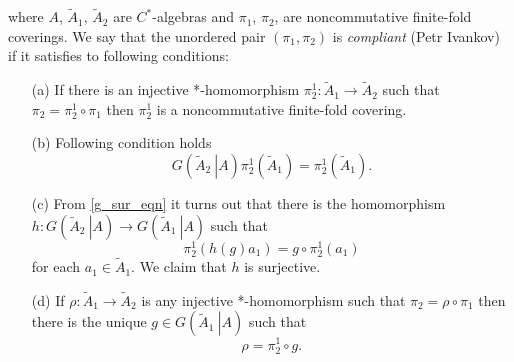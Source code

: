 \documentclass{beamer}
\theoremstyle{plain}
\newcommand{\be}{\begin{equation}}
\newcommand{\ee}{\end{equation}}
\begin{document}
	where $A$, $\widetilde A_1$, $\widetilde A_2$ are $C^*$-algebras and $\pi_1$, $\pi_2$, are noncommutative finite-fold coverings. We say that the unordered pair $\left( \pi_1,\pi_2\right) $ is \textit{compliant} (\alert{Petr Ivankov}) if  it satisfies to following conditions:
	\begin{enumerate}
		\item[(a)]
		If there is an injective *-homomorphism $\pi^1_2: \widetilde A_1 \to \widetilde A_2$ such that $\pi_2 = \pi^1_2 \circ \pi_1$ then $\pi^1_2$ is  a noncommutative finite-fold  covering.
		\item[(b)] Following condition holds
		\be\label{g_sur_eqn}
		G\left(\left.\widetilde A_2~\right|A \right)\pi^1_2\left(\widetilde A_1\right)=  \pi^1_2\left(\widetilde A_1\right).
		\ee 
\pagebreak
\newline
		\item[(c)] From \eqref{g_sur_eqn} it turns out that there is the homomorphism $h: G\left(\left.\widetilde A_2~\right|A \right)\to 	G\left(\left.\widetilde A_1~\right|A \right)$ such that 
		$$
		\pi^1_2\left( h\left(g \right)a_1\right) = g \circ \pi^1_2\left(a_1 \right)
		$$
		for each $a_1 \in \widetilde A_1$.  
		We claim that $h$ is surjective. 
		\item[(d)] If  $\rho: \widetilde A_1 \to \widetilde A_2$ is any injective *-homomorphism  such that $\pi_2 = \rho \circ \pi_1$ then there is the unique $g \in 	G\left(\left.\widetilde A_1~\right|A \right)$ such that 
		\be\label{compliant_covering_g_eqn}
		\rho =  \pi^1_2 \circ g.
		\ee
		\newline
	\end{enumerate}
\end{document}
